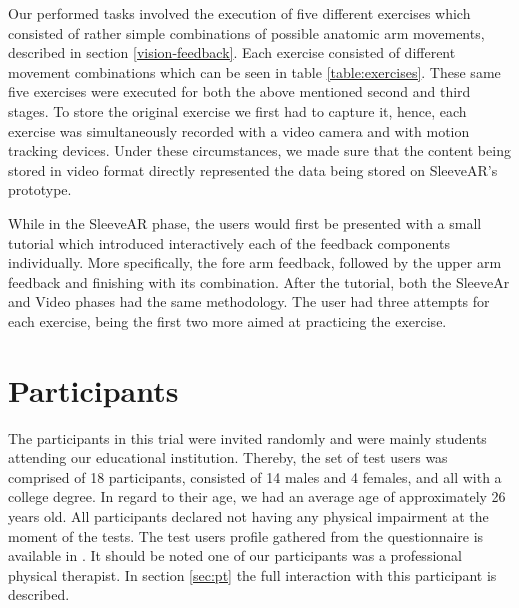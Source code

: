 Our performed tasks involved the execution of five different exercises which consisted of rather simple combinations of possible anatomic arm movements, described in section \ref{vision-feedback}.
Each exercise consisted of different movement combinations which can be seen in table \ref{table:exercises}.
These same five exercises were executed for both the above mentioned second and third stages.
To store the original exercise we first had to capture it, hence, each exercise was simultaneously recorded with a video camera and with motion tracking devices. Under these circumstances, we made sure that the content being stored in video format directly represented the data being stored on SleeveAR's prototype.

While in the SleeveAR phase, the users would first be presented with a small tutorial which introduced interactively each of the feedback components individually. 
More specifically, the fore arm feedback, followed by the upper arm feedback and finishing with its combination.
After the tutorial, both the SleeveAr and Video phases had the same methodology. 
The user had three attempts for each exercise, being the first two more aimed at practicing the exercise.

\begin{table}[!t]
\centering
{}
\caption{Arm movements in exercises.}
\label{table:exercises}
\end{table}


\section{Participants} 


The participants in this trial were invited randomly and were mainly students attending our educational
institution. Thereby, the set of test users was comprised of 18 participants, consisted of 14 males and 4 females,
and all with a college degree. In regard to their age, we had an average age of approximately 26 years old. 
All participants declared not having any physical impairment at the moment of the tests. 
The test users profile gathered from the questionnaire is available in .
It should be noted one of our participants was a professional physical therapist. 
In section \ref{sec:pt} the full interaction with this participant is described.


